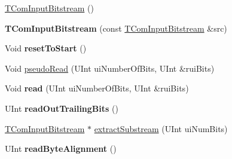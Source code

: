 {\bf }\par
\begin{DoxyCompactItemize}
\item 
\hyperlink{class_t_com_input_bitstream_a1614ece9f93086929270fd9cacbe1fa5}{T\+Com\+Input\+Bitstream} ()
\item 
\mbox{\label{class_t_com_input_bitstream_a030bcb39e6ddb911fde8c61e4b8203d7}} 
{\bfseries T\+Com\+Input\+Bitstream} (const \hyperlink{class_t_com_input_bitstream}{T\+Com\+Input\+Bitstream} \&src)
\item 
\mbox{\label{class_t_com_input_bitstream_a9510bf214a7941459044b878b429b04f}} 
Void {\bfseries reset\+To\+Start} ()
\item 
Void \hyperlink{class_t_com_input_bitstream_a641f89e7e0d543aad8bf9aa9180878ae}{pseudo\+Read} (U\+Int ui\+Number\+Of\+Bits, U\+Int \&rui\+Bits)
\item 
\mbox{\label{class_t_com_input_bitstream_ac4c03512a258dd676d98da15725b9442}} 
Void {\bfseries read} (U\+Int ui\+Number\+Of\+Bits, U\+Int \&rui\+Bits)
\item 
\mbox{\label{class_t_com_input_bitstream_ada1a8907eaa008bb8985d0109713c616}} 
U\+Int {\bfseries read\+Out\+Trailing\+Bits} ()
\item 
\hyperlink{class_t_com_input_bitstream}{T\+Com\+Input\+Bitstream} $\ast$ \hyperlink{class_t_com_input_bitstream_a8d6c02be422f2e8afea9b47b2f92581c}{extract\+Substream} (U\+Int ui\+Num\+Bits)
\item 
\mbox{\label{class_t_com_input_bitstream_a704d4ab8f6a57b18c4041ae33b9ec478}} 
U\+Int {\bfseries read\+Byte\+Alignment} ()
\end{DoxyCompactItemize}

